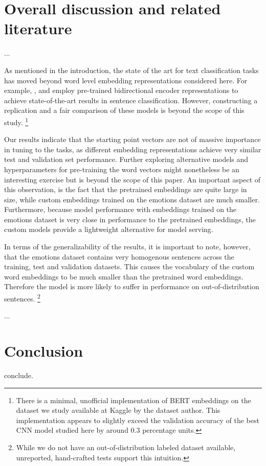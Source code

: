 \documentclass[conference]{IEEEtran}
\begin{document}
\section{Overall discussion and related literature}
...

As mentioned in the introduction, the state of the art for text classification tasks has moved beyond word level embedding representations considered here. For example, \cite{bert}, \cite{xlnet} and \cite{bertclassification} employ pre-trained bidirectional encoder representations to achieve state-of-the-art results in sentence classification. However, constructing a replication and a fair comparison of these models is beyond the scope of this study.
\footnote{There is a minimal, unofficial implementation of BERT\cite{bert} embeddings on the dataset we study\cite{kaggledata} available at Kaggle by the dataset author. This implementation appears to slightly exceed the validation accuracy of the best CNN model studied here by around 0.3 percentage units.}

Our results indicate that the starting point vectors are not of massive importance in tuning to the tasks, as different embedding representations achieve very similar test and validation set performance. Further exploring alternative models and hyperparameters for pre-training the word vectors might nonetheless be an interesting exercise but is beyond the scope of this paper. An important aspect of this observation, is the fact that the pretrained embeddings are quite large in size, while custom embeddings trained on the emotions dataset are much smaller. Furthermore, because model performance with embeddings trained on the emotions dataset is very close in performance to the pretrained embeddings, the custom models provide a lightweight alternative for model serving. 

In terms of the generalizability of the results, it is important to note, however, that the emotions dataset contains very homogenous sentences across the training, test and validation datasets. This causes the vocabulary of the custom word embeddings to be much smaller than the pretrained word embeddings. Therefore the model is more likely to suffer in performance on out-of-distribution sentences. 
\footnote{While we do not have an out-of-distribution labeled dataset available, unreported, hand-crafted tests support this intuition.}

...

\section{Conclusion}
conclude.
\end{document}
